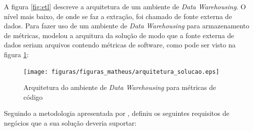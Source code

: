 A figura \ref{fig:etl} descreve a arquitetura de um ambiente de \textit{Data Warehousing}. O nível mais baixo, de onde se faz a extração, foi chamado de fonte externa de dados. Para fazer uso de um ambiente de \textit{Data Warehousing} para armazenamento de métricas,  modelou a arquitura da solução de modo que a fonte externa de dados seriam arquivos contendo métricas de software, como pode ser visto na figura \ref{fig:arquitetura_solucao}:

\begin{figure}[h!]
\centering
\texttt{[image: figuras/figuras\_matheus/arquitetura\_solucao.eps]}
\caption{Arquitetura do ambiente de \textit{Data Warehousing} para métricas de código}
\label{fig:arquitetura_solucao}
\end{figure}
\FloatBarrier

Seguindo a metodologia apresentada por ,  definiu os seguintes requisitos de negócios que a sua solução deveria suportar:


